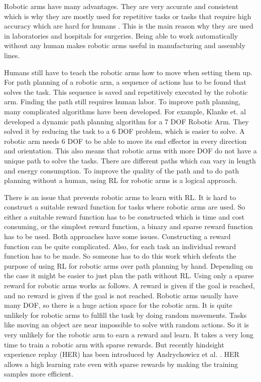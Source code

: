 \vspace{0.5cm}

Robotic arms have many advantages. They are very accurate and consistent which is why they are mostly used for repetitive tasks or tasks that require high accuracy which are hard for humans \cite{roboarmuk}. 
This is the main reason why they are used in laboratories and hospitals for surgeries. Being able to work automatically without any human makes robotic arms useful in manufacturing and assembly lines. 

\vspace{0.5cm}

Humans still have to teach the robotic arms how to move when 
setting them up. For path planning of a robotic arm, a sequence of actions has to be found that solves the task. This sequence is saved and repetitively executed by the robotic arm. Finding the path still requires human labor. To improve path planning, many complicated algorithms have been developed. For example, Klanke et. al \cite{dynpath} developed a dynamic path planning algorithm for a 7 DOF Robotic Arm. They solved it by reducing the task to a 6 DOF problem, which is easier to solve.
A robotic arm needs 6 DOF to be able to move its end effector in every direction and orientation. This also means that robotic arms with more DOF do not have a unique path to solve the tasks. There are different paths which can vary in length and energy consumption.
To improve the quality of the path and to do path planning without a human, using RL for robotic arms is a logical approach. 

\vspace{0.5cm}

There is an issue that prevents robotic arms to learn with RL. It is hard to construct a suitable reward function for tasks where robotic arms are used. 
So either a suitable reward function has to be constructed which is time and cost consuming, or the simplest reward function, a binary and sparse reward function has to be used. Both approaches have some issues. 
\newline
Constructing a reward function can be quite complicated. Also, for each task an individual reward function has to be made. So someone has to do this work which defeats the purpose of using RL for robotic arms over path planning by hand. Depending on the case it might be easier to just plan the path without RL.
\newline
Using only a sparse reward for robotic arms works as follows. A reward is given if the goal is reached, and no reward is given if the goal is not reached. Robotic arms usually have many DOF, so there is a huge action space for the robotic arm. It is quite unlikely for robotic arms to fulfill the task by doing random movements. Tasks like moving an object are near impossible to solve with random actions. 
So it is very unlikely for the robotic arm to earn a reward and learn. It takes a very long time to train a robotic arm with sparse rewards.
But recently hindsight experience replay (HER) has been introduced by Andrychowicz et al. \cite{herpaper}.
HER allows a high learning rate even with sparse rewards by making the training samples more efficient. 

